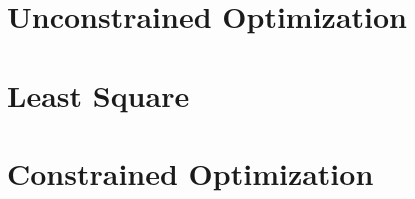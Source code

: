 \newpage
\section{Unconstrained Optimization}

\newpage
\section{Least Square}

\newpage
\section{Constrained Optimization}

